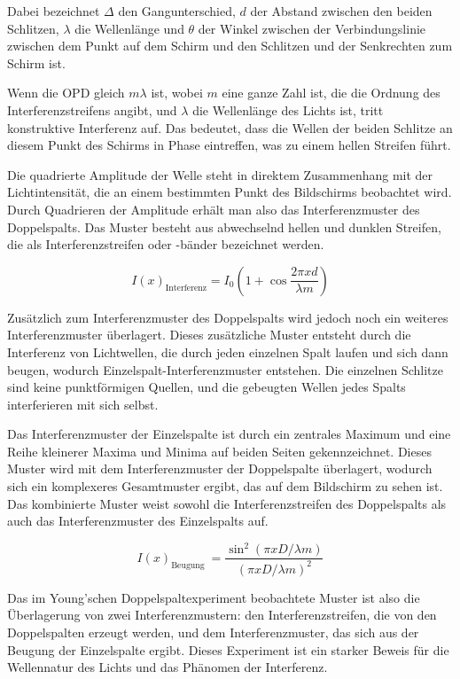\documentclass[12pt,english,ngerman]{scrartcl}
\begin{document}

Dabei bezeichnet $\Delta$ den Gangunterschied, $d$ der Abstand zwischen den
beiden Schlitzen, $\lambda$ die Wellenlänge und $\theta$ der Winkel zwischen
der Verbindungslinie zwischen dem Punkt auf dem Schirm und den Schlitzen und
der Senkrechten zum Schirm ist.

Wenn die OPD gleich $m \lambda$ ist, wobei $m$ eine ganze Zahl ist, die die
Ordnung des Interferenzstreifens angibt, und $\lambda$ die Wellenlänge des
Lichts ist, tritt konstruktive Interferenz auf. Das bedeutet, dass die Wellen
der beiden Schlitze an diesem Punkt des Schirms in Phase eintreffen, was zu
einem hellen Streifen führt.

Die quadrierte Amplitude der Welle steht in direktem Zusammenhang mit der
Lichtintensität, die an einem bestimmten Punkt des Bildschirms beobachtet wird.
Durch Quadrieren der Amplitude erhält man also das Interferenzmuster des
Doppelspalts. Das Muster besteht aus abwechselnd hellen und dunklen Streifen,
die als Interferenzstreifen oder -bänder bezeichnet werden.

\begin{equation}
	I(x)_{\text {Interferenz}}=I_0\left(1+\cos \frac{2 \pi x d}{\lambda m}\right)
\end{equation}

Zusätzlich zum Interferenzmuster des Doppelspalts wird jedoch noch ein weiteres
Interferenzmuster überlagert. Dieses zusätzliche Muster entsteht durch die
Interferenz von Lichtwellen, die durch jeden einzelnen Spalt laufen und sich
dann beugen, wodurch Einzelspalt-Interferenzmuster entstehen. Die einzelnen
Schlitze sind keine punktförmigen Quellen, und die gebeugten Wellen jedes
Spalts interferieren mit sich selbst.

Das Interferenzmuster der Einzelspalte ist durch ein zentrales Maximum und eine
Reihe kleinerer Maxima und Minima auf beiden Seiten gekennzeichnet. Dieses
Muster wird mit dem Interferenzmuster der Doppelspalte überlagert, wodurch sich
ein komplexeres Gesamtmuster ergibt, das auf dem Bildschirm zu sehen ist. Das
kombinierte Muster weist sowohl die Interferenzstreifen des Doppelspalts als
auch das Interferenzmuster des Einzelspalts auf.

\begin{equation}
	I(x)_{\text {Beugung }}=\frac{\sin ^2(\pi x D / \lambda m)}{(\pi x D / \lambda m)^2}
\end{equation}

Das im Young'schen Doppelspaltexperiment beobachtete Muster ist also die
Überlagerung von zwei Interferenzmustern: den Interferenzstreifen, die von den
Doppelspalten erzeugt werden, und dem Interferenzmuster, das sich aus der
Beugung der Einzelspalte ergibt. Dieses Experiment ist ein starker Beweis für
die Wellennatur des Lichts und das Phänomen der Interferenz.
\end{document}
